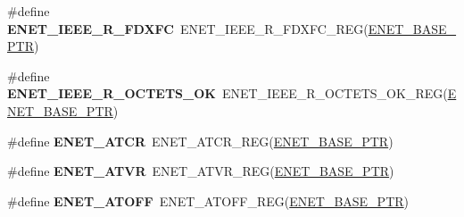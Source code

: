 \begin{DoxyCompactItemize}
\item 
\hypertarget{group___e_n_e_t___register___accessor___macros_gac3b1be1bb00c5beae0960855d0a8920d}{}\#define {\bfseries E\+N\+E\+T\+\_\+\+I\+E\+E\+E\+\_\+\+R\+\_\+\+F\+D\+X\+F\+C}~E\+N\+E\+T\+\_\+\+I\+E\+E\+E\+\_\+\+R\+\_\+\+F\+D\+X\+F\+C\+\_\+\+R\+E\+G(\hyperlink{group___e_n_e_t___peripheral_gab64a2d991cc2bd76dd55ee25a52dcb5c}{E\+N\+E\+T\+\_\+\+B\+A\+S\+E\+\_\+\+P\+T\+R})\label{group___e_n_e_t___register___accessor___macros_gac3b1be1bb00c5beae0960855d0a8920d}

\item 
\hypertarget{group___e_n_e_t___register___accessor___macros_ga403d0f99ada0b01ac91b2a422b434f2e}{}\#define {\bfseries E\+N\+E\+T\+\_\+\+I\+E\+E\+E\+\_\+\+R\+\_\+\+O\+C\+T\+E\+T\+S\+\_\+\+O\+K}~E\+N\+E\+T\+\_\+\+I\+E\+E\+E\+\_\+\+R\+\_\+\+O\+C\+T\+E\+T\+S\+\_\+\+O\+K\+\_\+\+R\+E\+G(\hyperlink{group___e_n_e_t___peripheral_gab64a2d991cc2bd76dd55ee25a52dcb5c}{E\+N\+E\+T\+\_\+\+B\+A\+S\+E\+\_\+\+P\+T\+R})\label{group___e_n_e_t___register___accessor___macros_ga403d0f99ada0b01ac91b2a422b434f2e}

\item 
\hypertarget{group___e_n_e_t___register___accessor___macros_gaddc99bc80c74acbf3ea1d0099c0b094b}{}\#define {\bfseries E\+N\+E\+T\+\_\+\+A\+T\+C\+R}~E\+N\+E\+T\+\_\+\+A\+T\+C\+R\+\_\+\+R\+E\+G(\hyperlink{group___e_n_e_t___peripheral_gab64a2d991cc2bd76dd55ee25a52dcb5c}{E\+N\+E\+T\+\_\+\+B\+A\+S\+E\+\_\+\+P\+T\+R})\label{group___e_n_e_t___register___accessor___macros_gaddc99bc80c74acbf3ea1d0099c0b094b}

\item 
\hypertarget{group___e_n_e_t___register___accessor___macros_gacd0718dcf5c4b96802f4d79530981ca6}{}\#define {\bfseries E\+N\+E\+T\+\_\+\+A\+T\+V\+R}~E\+N\+E\+T\+\_\+\+A\+T\+V\+R\+\_\+\+R\+E\+G(\hyperlink{group___e_n_e_t___peripheral_gab64a2d991cc2bd76dd55ee25a52dcb5c}{E\+N\+E\+T\+\_\+\+B\+A\+S\+E\+\_\+\+P\+T\+R})\label{group___e_n_e_t___register___accessor___macros_gacd0718dcf5c4b96802f4d79530981ca6}

\item 
\hypertarget{group___e_n_e_t___register___accessor___macros_gadb1f06cd76fa4284e71f878d8bca3bc3}{}\#define {\bfseries E\+N\+E\+T\+\_\+\+A\+T\+O\+F\+F}~E\+N\+E\+T\+\_\+\+A\+T\+O\+F\+F\+\_\+\+R\+E\+G(\hyperlink{group___e_n_e_t___peripheral_gab64a2d991cc2bd76dd55ee25a52dcb5c}{E\+N\+E\+T\+\_\+\+B\+A\+S\+E\+\_\+\+P\+T\+R})\label{group___e_n_e_t___register___accessor___macros_gadb1f06cd76fa4284e71f878d8bca3bc3}


\end{DoxyCompactItemize}
